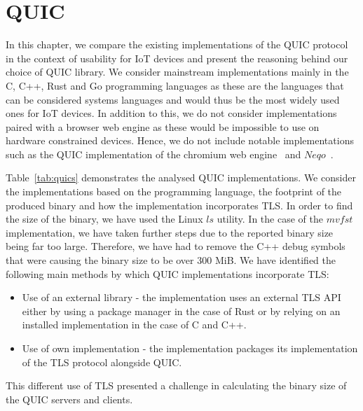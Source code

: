 \section{QUIC} \label{section:quic_impl}

In this chapter, we compare the existing implementations of the QUIC protocol in the context of usability for IoT devices and present the reasoning behind our choice of QUIC library.
We consider mainstream implementations mainly in the C, C++, Rust and Go programming languages as these are the languages that can be considered systems languages and would thus be the most widely used ones for IoT devices.
In addition to this, we do not consider implementations paired with a browser web engine as these would be impossible to use on hardware constrained devices.
Hence, we do not include notable implementations such as the QUIC implementation of the chromium web engine~\citep{chromium_quic_2021} and $Neqo$~\citep{mozilla_neqo_2022}.

Table~\ref{tab:quics} demonstrates the analysed QUIC implementations.
We consider the implementations based on the programming language, the footprint of the produced binary and how the implementation incorporates TLS.
In order to find the size of the binary, we have used the Linux $ls$ utility.
In the case of the $mvfst$ implementation, we have taken further steps due to the reported binary size being far too large.
Therefore, we have had to remove the C++ debug symbols that were causing the binary size to be over 300 MiB.
We have identified the following main methods by which QUIC implementations incorporate TLS:

\begin{itemize}
    \item Use of an external library - the implementation uses an external TLS API either by using a package manager in the case of Rust or by relying on an installed implementation in the case of C and C++.
    \item Use of own implementation - the implementation packages its implementation of the TLS protocol alongside QUIC.
\end{itemize}

This different use of TLS presented a challenge in calculating the binary size of the QUIC servers and clients.

